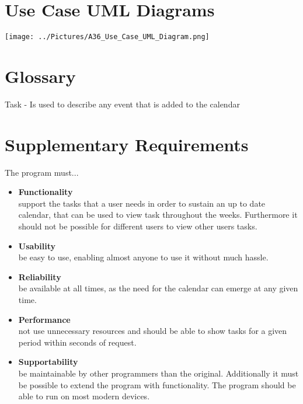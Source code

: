 \documentclass[a4paper, 10pt]{article}
\begin{document}
\section{Use Case UML Diagrams}

\texttt{[image: ../Pictures/A36\_Use\_Case\_UML\_Diagram.png]} 

\section{Glossary}
Task - Is used to describe any event that is added to the calendar

\section{Supplementary Requirements}
The program must...
\begin{itemize}
\item \textbf{Functionality}
	\\support the tasks that a user needs in order to sustain an up to date calendar, that can be used to view task throughout the weeks. Furthermore it should not be possible for different users to view other users tasks.
\item \textbf{Usability}
	\\be easy to use, enabling almost anyone to use it without much hassle.
\item \textbf{Reliability}
	\\be available at all times, as the need for the calendar can emerge at any given time.
\item \textbf{Performance}
	\\not use unnecessary resources and should be able to show tasks for a given period within seconds of request.
\item \textbf{Supportability}
	\\be maintainable by other programmers than the original. Additionally it must be possible to extend the program with functionality. The program should be able to run on most modern devices.
\end{itemize}
\end{document}
